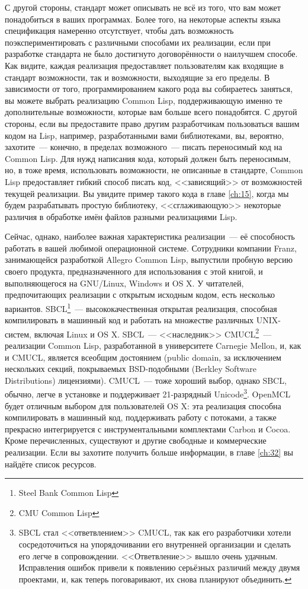 С другой стороны, стандарт может описывать не всё из того, что вам может понадобиться в
ваших программах. Более того, на некоторые аспекты языка спецификация намеренно
отсутствует, чтобы дать возможность поэкспериментировать с различными способами их
реализации, если при разработке стандарта не было достигнуто договорённости о наилучшем
способе. Как видите, каждая реализация предоставляет пользователям как входящие в стандарт
возможности, так и возможности, выходящие за его пределы. В зависимости от того,
программированием какого рода вы собираетесь заняться, вы можете выбрать реализацию Common
Lisp, поддерживающую именно те дополнительные возможности, которые вам больше всего
понадобятся. С другой стороны, если вы предоставите право другим разработчикам
пользоваться вашим кодом на Lisp, например, разработанными вами библиотеками, вы,
вероятно, захотите~--- конечно, в пределах возможного~--- писать переносимый код на Common
Lisp. Для нужд написания кода, который должен быть переносимым, но, в тоже время,
использовать возможности, не описанные в стандарте, Common Lisp предоставляет гибкий
способ писать код, <<зависящий>> от возможностей текущей реализации. Вы увидите пример
такого кода в главе \ref{ch:15}, когда мы будем разрабатывать простую библиотеку,
<<сглаживающую>> некоторые различия в обработке имён файлов разными реализациями Lisp.

Сейчас, однако, наиболее важная характеристика реализации~--- её способность работать в
вашей любимой операционной системе. Сотрудники компании Franz, занимающейся разработкой
Allegro Common Lisp, выпустили пробную версию своего продукта, предназначенного для
использования с этой книгой, и выполняющегося на GNU/Linux, Windows и OS X. У читателей,
предпочитающих реализации с открытым исходным кодом, есть несколько
вариантов. SBCL\footnote{Steel Bank Common Lisp}~--- высококачественная открытая
реализация, способная компилировать в машинный код и работать на множестве различных
UNIX-систем, включая Linux и OS X. SBCL~--- <<наследник>> CMUCL\footnote{CMU Common
  Lisp}~--- реализации Common Lisp, разработанной в университете Carnegie Mellon,
и, как и CMUCL, является всеобщим достоянием (public domain, за исключением нескольких
секций, покрываемых BSD-подобными (Berkley Software Distributions) лицензиями). CMUCL~---
тоже хороший выбор, однако SBCL, обычно, легче в установке и поддерживает 21-разрядный
Unicode\footnote{SBCL стал <<ответвлением>> CMUCL, так как его разработчики хотели
  сосредоточиться на упорядочивании его внутренней организации и сделать его легче в
  сопровождении. <<Ответвление>> вышло очень удачным. Исправления ошибок привели к появлению
  серьёзных различий между двумя проектами, и, как теперь поговаривают, их снова планируют
  объединить.}. OpenMCL будет отличным выбором для пользователей OS X: эта
реализация способна компилировать в машинный код, поддерживать работу с потоками, а также
прекрасно интегрируется с инструментальными комплектами Carbon и Cocoa. Кроме
перечисленных, существуют и другие свободные и коммерческие реализации. Если вы захотите
получить больше информации, в главе \ref{ch:32} вы найдёте список ресурсов.

